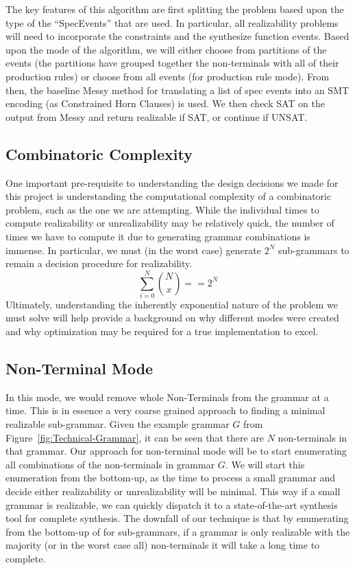 \documentclass[acmsmall, nonacm]{acmart}
\begin{document}
The key features of this algorithm are first splitting the problem based upon the
type of the ``SpecEvents'' that are used. In particular, all realizability problems will need to incorporate the constraints and the synthesize function events. Based upon the mode of the algorithm, we will either
choose from partitions of the events (the partitions have grouped together the non-terminals with all of their production rules) or choose from all events (for production rule mode).
From then, the baseline Messy method for translating a list of spec events into an SMT encoding (as Constrained Horn Clauses) is used. We then check SAT on the output from Messy and return realizable if SAT, or continue if UNSAT.

\subsection{Combinatoric Complexity}
One important pre-requisite to understanding the design decisions we made for this project is understanding the computational complexity of a combinatoric problem, such as the one we are attempting.
While the individual times to compute realizability or unrealizability may be
relatively quick, the number of times we have to compute it due to
generating grammar combinations is immense.
In particular, we must (in the worst case) generate $2^N$ sub-grammars to
remain a decision procedure for realizability.
$$\sum_{i = 0}^{N} {N \choose x} == 2^N$$
Ultimately, understanding the inherently exponential nature of the problem
we must solve will help provide a background on why different modes were created
and why optimization may be required for a true implementation to excel.


\subsection{Non-Terminal Mode}
In this mode, we would remove whole Non-Terminals from the grammar at a time.
This is in essence a very coarse grained approach to finding a minimal
realizable sub-grammar. Given the example grammar $G$ from Figure~\ref{fig:Technical-Grammar}, it can be seen that there are $N$ non-terminals in
that grammar.
Our approach for non-terminal mode will be to start enumerating all combinations
of the non-terminals in grammar $G$. We will start this enumeration from the bottom-up, as the time to process a small grammar and decide either
realizability or unrealizability will be minimal. This way if a small grammar
is realizable, we can quickly dispatch it to a state-of-the-art synthesis tool
for complete synthesis. The downfall of our technique is that by enumerating from the bottom-up of for sub-grammars, if a grammar is only realizable with the majority (or in the worst case all) non-terminals it will take a long time to complete.
\end{document}
